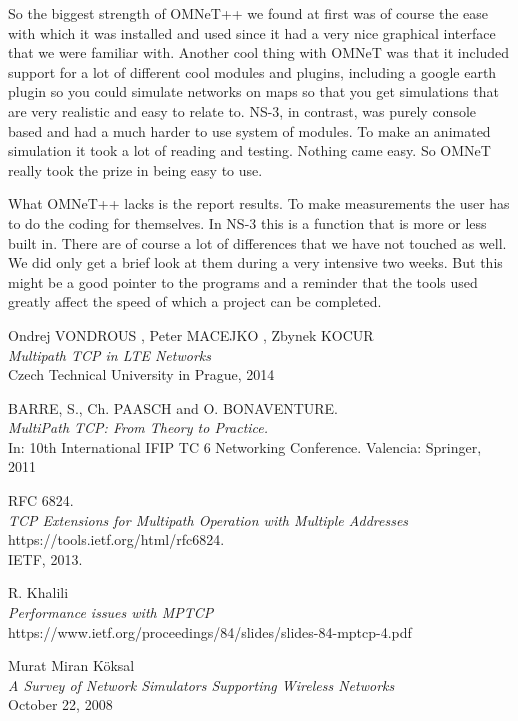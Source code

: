 \documentclass[11pt,twocolumn]{article}
\begin{document}
So the biggest strength of OMNeT++ we found at first was of course the ease with which it was installed and used since it had a very nice graphical interface that we were familiar with. Another cool thing with OMNeT was that it included support for a lot of different cool modules and plugins, including a google earth plugin so you could simulate networks on maps so that you get simulations that are very realistic and easy to relate to. NS-3, in contrast, was purely console based and had a much harder to use system of modules. To make an animated simulation it took a lot of reading and testing. Nothing came easy. So OMNeT really took the prize in being easy to use.

What OMNeT++ lacks is the report results. To make measurements the user has to do the coding for themselves. In NS-3 this is a function that is more or less built in. There are of course a lot of differences that we have not touched as well. We did only get a brief look at them during a very intensive two weeks. But this might be a good pointer to the programs and a reminder that the tools used greatly affect the speed of which a project can be completed.

\newpage

\begin{thebibliography}{9}

Ondrej VONDROUS , Peter MACEJKO , Zbynek KOCUR \\
\emph{Multipath TCP in LTE Networks}\\
Czech Technical University in Prague, 2014

BARRE, S., Ch. PAASCH and O. BONAVENTURE.\\
\emph{MultiPath TCP: From Theory to Practice.}\\
In: 10th International IFIP TC 6 Networking
Conference. Valencia: Springer, 2011

RFC 6824.  \\
\emph{TCP Extensions for Multipath Operation with Multiple Addresses} \\ 
https://tools.ietf.org/html/rfc6824.\\ IETF, 2013.

R. Khalili\\
\emph{Performance issues with MPTCP}\\
https://www.ietf.org/proceedings/84/slides/slides-84-mptcp-4.pdf



Murat Miran Köksal\\
\emph{A Survey of Network Simulators Supporting Wireless Networks} \\
October 22, 2008



\end{thebibliography}
\end{document}
